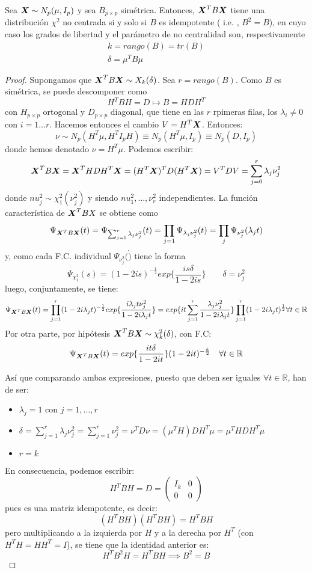 \begin{nth}
  Sea $\boldsymbol{X} \sim N_p(\mu, I_p)$ y sea $B_{p\times p}$ simétrica. Entonces, $\boldsymbol{X}^T B \boldsymbol{X}$ tiene una distribución $\chi^2$ no centrada si y solo si $B$ es idempotente ( i.e. , $B^2 = B$), en cuyo caso los grados de libertad y el parámetro de no centralidad son, respectivamente
  \begin{align}
    k = rango(B) = tr(B)\\
    \delta = \mu^T B \mu
  \end{align}
\end{nth}
\begin{proof}
  \boxed{\rightarrow} Supongamos que $\boldsymbol{X}^T B \boldsymbol{X} \sim X_k(\delta)$. Sea $r=rango(B)$. Como $B$ es simétrica, se puede descomponer como
  \[
  H^T B H = D \mapsto B = HDH^T
  \]
  con $H_{p\times p}$ ortogonal y $D_{p\times p}$ diagonal, que tiene en las $r$ rpimeras filas, los $\lambda_i \ne 0$ con $i = 1\dots r$. Hacemos entonces el cambio $V = H^T \boldsymbol{X}$. Entonces:
  \[
  \nu \sim N_p(H^T \mu,H^TI_p H) \equiv N_p(H^T \mu,I_p) \equiv N_p(D,I_p)
  \]
  donde hemos denotado $\nu = H^T\mu$. Podemos escribir:
  \[
  \boldsymbol{X}^T B \boldsymbol{X} = \boldsymbol{X}^T H D H^T \boldsymbol{X} = (H^T \boldsymbol{X})^T D (H^T \boldsymbol{X}) = V^T D V =  \sum_{j = 0}^r \lambda_j \nu_j^2
  \]
  donde $nu_j^2\sim \chi_1^2(\nu_j^2)$ y siendo $nu_1^2,\dots,\nu_r^2$ independientes. La función característica de $\boldsymbol{X}^T B X$ se obtiene como
  \[
\Psi_{\boldsymbol{X}^T B \boldsymbol{X}}(t) = \Psi_{\sum_{j=1}^r \lambda_j \nu_j^2}(t) = \prod_{j=1}\Psi_{\lambda_j \nu_j^2}(t) = \prod_j \Psi_{\nu_j^2}(\lambda_j t)
\]
y, como cada F.C. individual $\Psi_{\nu_j^2}(\dot)$ tiene la forma
\[
\Psi_{\chi^2_1}(s) = (1-2is)^{-\frac{1}{2}} exp \{ \frac{is\delta}{1-2is}\} \quad \quad \delta = \nu_j^2
\]
luego, conjuntamente, se tiene:
\[
\Psi_{\boldsymbol{X}^T B \boldsymbol{X}}(t) = \prod_{j = 1}^r (1-2i \lambda_jt)^{-\frac{1}{2}} exp \{ \frac{i\lambda_j t \nu^2_j}{1-2i\lambda_jt}\} = exp\{it \sum_{j = 1}^r \frac{\lambda_j \nu_j^2}{1-2i\lambda_jt} \}\prod_{j = 1}^r(1-2i\lambda_j t)^{\frac{1}{2}} \forall t \in \mathbb R
\]
Por otra parte, por hipótesis $\boldsymbol{X}^T B \boldsymbol{X} \sim \chi_k^2(\delta)$, con F.C:
\[
\Psi_{\boldsymbol{X} ^T B \boldsymbol{X}}(t) =  exp \{ \frac{it\delta}{1-2it}\}(1-2it)^{-\frac{k}{2}} \quad \forall t \in \mathbb R
\]

Así que comparando ambas expresiones, puesto que deben ser iguales $\forall t \in \mathbb R$, han de ser:
\begin{itemize}
\item $\lambda_j = 1$ con $ j = 1,\dots,r$
\item $\delta = \sum_{j = 1}^r \lambda_j \nu_j^2 = \sum_{j = 1}^r \nu_j^2 = \nu^T D \nu = (\mu^TH)DH^T\mu = \mu^THDH^T\mu$
  \item $r = k$
\end{itemize}
En consecuencia, podemos escribir:
\[
H^T B H = D = \begin{pmatrix} I_k & 0 \\ 0 & 0 \end{pmatrix}
\]
pues es una matriz idempotente, es decir:
\[
(H^T B H) (H^T B H) = H^T B H
\]
pero multiplicando a la izquierda por $H$ y a la derecha por $H^T$ (con $H^TH = HH^T = I$), se tiene que la identidad anterior es:
\[
H^T B^2 H = H^T B H \implies B^2  = B
\]


\end{proof}
